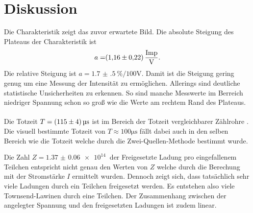 \section{Diskussion}
\label{sec:Diskussion}
Die Charakteristik zeigt das zuvor erwartete Bild.
Die absolute Steigung des Plateaus der Charakteristik ist 
\begin{align*}
 a =& \SI{1.16(22)}{\frac{\text{Imp}}{\V}}. \\
\end{align*}
Die relative Steigung ist $a=\SI{1.7(5)}{\percent\per100\volt}$.
Damit ist die Steigung gering genug um eine Messung der Intensität zu ermöglichen.
Allerings sind deutliche statistische Unsicherheiten zu erkennen.
So sind manche Messwerte im Berreich niedriger Spannung schon so groß wie die Werte am rechtem Rand des Plateaus.
\\\\
Die Totzeit $T = \SI{115+-4}{\micro\second} $ ist im Bereich der Totzeit vergleichbarer Zählrohre \cite{anleitung603}.
Die visuell bestimmte Totzeit von $T \approx 100\si{\micro\second}$ fällt dabei auch in den selben Bereich wie die Totzeit welche durch die Zwei-Quellen-Methode bestimmt wurde.


Die Zahl $Z = \SI{1.37(6)e+14}{}$ der Freigesetzte Ladung pro eingefallenem Teilchen entspricht nicht genau den Werten von $Z$ welche durch die Berechung mit der Stromstärke $I$ ermittelt wurden.
Dennoch zeigt sich, dass tatsächlich sehr viele Ladungen durch ein Teilchen freigesetzt werden.
Es entstehen also viele Townsend-Lawinen durch eine Teilchen.
Der Zusammenhang zwischen der angelegter Spannung und den freigesetzten Ladungen ist zudem linear.
